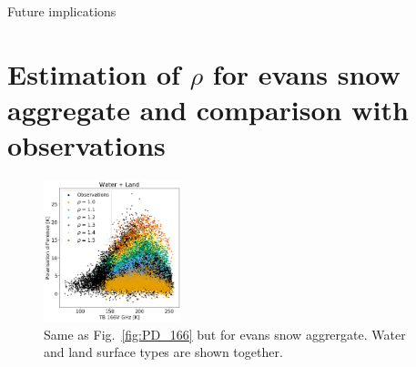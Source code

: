 \documentclass[amt, manuscript]{copernicus}
\newcommand{\todo}[1]{{\color{red} #1}}
\begin{document}
\todo{Future implications}




 


 




















\appendix


\section{Estimation of $\rho$ for evans snow aggregate and comparison with observations} 
%
\label{app:esa}

\begin{figure}[t]
	\includegraphics[width=4cm]{Figures/PD_water_varying_rho_water_land_esa.png}
	\caption{Same as Fig.~\ref{fig:PD_166} but for evans snow aggrergate. Water and land surface types are shown together.  }
	\label{fig:PD_esa}
\end{figure}
\end{document}
